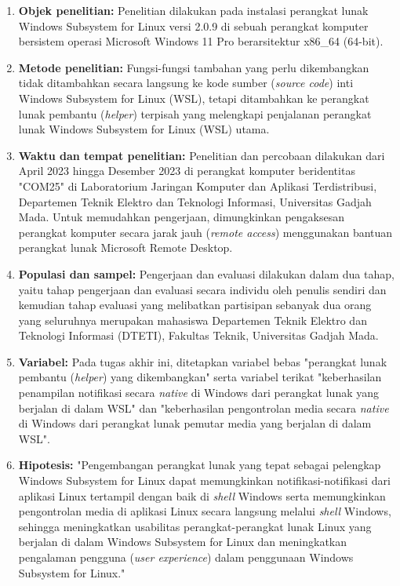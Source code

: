 \begin{enumerate}
    \item \textbf{Objek penelitian:} Penelitian dilakukan pada instalasi perangkat lunak Windows Subsystem for Linux versi 2.0.9 di sebuah perangkat komputer bersistem operasi Microsoft Windows 11 Pro berarsitektur x86\_64 (64-bit).
    
    \item \textbf{Metode penelitian:} Fungsi-fungsi tambahan yang perlu dikembangkan tidak ditambahkan secara langsung ke kode sumber (\textit{source code}) inti Windows Subsystem for Linux (WSL), tetapi ditambahkan ke perangkat lunak pembantu (\textit{helper}) terpisah yang melengkapi penjalanan perangkat lunak Windows Subsystem for Linux (WSL) utama.
    
    \item \textbf{Waktu dan tempat penelitian:} Penelitian dan percobaan dilakukan dari April 2023 hingga Desember 2023 di perangkat komputer beridentitas "COM25" di Laboratorium Jaringan Komputer dan Aplikasi Terdistribusi, Departemen Teknik Elektro dan Teknologi Informasi, Universitas Gadjah Mada. Untuk memudahkan pengerjaan, dimungkinkan pengaksesan perangkat komputer secara jarak jauh (\textit{remote access}) menggunakan bantuan perangkat lunak Microsoft Remote Desktop.
    
    \item \textbf{Populasi dan sampel:} Pengerjaan dan evaluasi dilakukan dalam dua tahap, yaitu tahap pengerjaan dan evaluasi secara individu oleh penulis sendiri dan kemudian tahap evaluasi yang melibatkan partisipan sebanyak dua orang yang seluruhnya merupakan mahasiswa Departemen Teknik Elektro dan Teknologi Informasi (DTETI), Fakultas Teknik, Universitas Gadjah Mada.
    
    \item \textbf{Variabel:} Pada tugas akhir ini, ditetapkan variabel bebas "perangkat lunak pembantu (\textit{helper}) yang dikembangkan" serta variabel terikat "keberhasilan penampilan notifikasi secara \textit{native} di Windows dari perangkat lunak yang berjalan di dalam WSL" dan "keberhasilan pengontrolan media secara \textit{native} di Windows dari perangkat lunak pemutar media yang berjalan di dalam WSL".
    
    \item \textbf{Hipotesis:} "Pengembangan perangkat lunak yang tepat sebagai pelengkap Windows Subsystem for Linux dapat memungkinkan notifikasi-notifikasi dari aplikasi Linux tertampil dengan baik di \textit{shell} Windows serta memungkinkan pengontrolan media di aplikasi Linux secara langsung melalui \textit{shell} Windows, sehingga meningkatkan usabilitas perangkat-perangkat lunak Linux yang berjalan di dalam Windows Subsystem for Linux dan meningkatkan pengalaman pengguna (\textit{user experience}) dalam penggunaan Windows Subsystem for Linux."
        

\end{enumerate}
